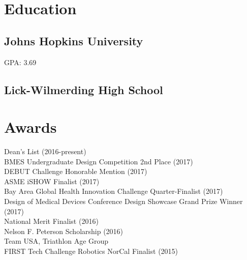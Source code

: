 \documentclass[]{deedy-resume}
\begin{document}
%
%

%
%

%
%

\begin{minipage}[t]{0.3\textwidth}


\section{Education} 

\subsection{Johns Hopkins University}
GPA: 3.69
\sectionsep

\subsection{Lick-Wilmerding High School}
\sectionsep


\section{Awards}
Dean's List (2016-present)\\
BMES Undergraduate Design Competition 2nd Place (2017)\\
DEBUT Challenge Honorable Mention (2017)\\
ASME iSHOW Finalist (2017)\\
Bay Area Global Health Innovation Challenge Quarter-Finalist (2017)\\
Design of Medical Devices Conference Design Showcase Grand Prize Winner (2017)\\
National Merit Finalist (2016)\\
Nelson F. Peterson Scholarship (2016)\\
Team USA, Triathlon Age Group\\
FIRST Tech Challenge Robotics NorCal Finalist (2015)
\sectionsep


\end{minipage}
\end{document}
